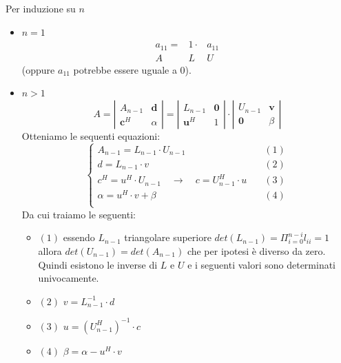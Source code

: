 \begin{thproof}
  Per induzione su $n$
  \begin{itemize}
  \item $n=1$\\
    \[\begin{array}{ccc}
      a_{11} = & 1 \cdot & a_{11} \\ 
      A        & L       & U
    \end{array}\]
    (oppure $a_{11}$ potrebbe essere uguale a $0$).
 \item $n>1$\\
\[
A = \left |
\begin{array}{c|c}
A_{n-1} & \mathbf{d} \\ \hline
\mathbf{c}^{H} &  \alpha
\end{array}
\right | = \left |
\begin{array}{c|c}
L_{n-1} & \mathbf{0} \\ \hline
\mathbf{u}^{H} &  1
\end{array}
\right |
\cdot
\left |
\begin{array}{c|c}
U_{n-1} & \mathbf{v} \\ \hline
\mathbf{0}      & \beta
\end{array}
\right |
\]
Otteniamo le sequenti equazioni:
\[\left\{
  \begin{array}{ll}
    A_{n-1} = L_{n-1} \cdot U_{n-1} & (1) \\
    d = L_{n-1} \cdot v           & (2)  \\
    c^{H} = u^{H} \cdot U_{n-1} \quad \rightarrow \quad 
    c = U^{H}_{n-1} \cdot u \quad  & (3) \\
    \alpha = u^{H} \cdot v + \beta &(4) \\
  \end{array}
\right.\]
Da cui traiamo le seguenti:
\begin{itemize}
\item $(1)$ essendo $L_{n-1}$ triangolare superiore $det(L_{n−1}) =
  \Pi_{i=0}^{n-i} l_{ii} = 1$ allora $det (U_{n-1}) = det(A_{n-1})$ che
  per ipotesi \`e diverso da zero. Quindi esistono le inverse di $L$ e $U$
  e i seguenti valori sono determinati univocamente.
\item $(2)$ $v = L^{-1}_{n-1} \cdot d$ 
\item $(3)$ $u = (U_{n-1}^{H})^{-1} \cdot c$
\item $(4)$ $\beta = \alpha - u^{H} \cdot v$ 
\end{itemize}
\end{itemize}
\end{thproof}

